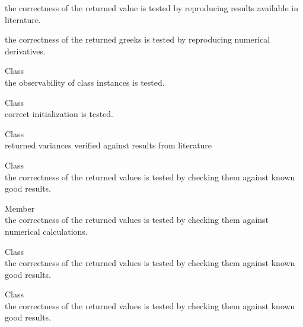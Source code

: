 \begin{DoxyRefList}
\begin{DoxyItemize}
\item the correctness of the returned value is tested by reproducing results available in literature.
\item the correctness of the returned greeks is tested by reproducing numerical derivatives. 
\end{DoxyItemize}
\item[Class \doxylink{class_quant_lib_1_1_quote}{Quant\+Lib\+::Quote} ]\hfill \\
\label{test__test000161}%
%
the observability of class instances is tested.  
\item[Class \doxylink{class_quant_lib_1_1_randomized_l_d_s}{Quant\+Lib\+::Randomized\+LDS\texorpdfstring{$<$}{<} LDS, PRS \texorpdfstring{$>$}{>}} ]\hfill \\
\label{test__test000060}%
%
correct initialization is tested.  
\item[Class \doxylink{class_quant_lib_1_1_replicating_variance_swap_engine}{Quant\+Lib\+::Replicating\+Variance\+Swap\+Engine} ]\hfill \\
\label{test__test000127}%
%
returned variances verified against results from literature  
\item[Class \doxylink{class_quant_lib_1_1_ridder}{Quant\+Lib\+::Ridder} ]\hfill \\
\label{test__test000074}%
%
the correctness of the returned values is tested by checking them against known good results. 
\item[Member \doxylink{namespace_quant_lib_ac53b76df55c7fbcc29b2636c8c311662}{Quant\+Lib\+::Risk\+Statistics} ]\hfill \\
\label{test__test000077}%
%
the correctness of the returned values is tested by checking them against numerical calculations.  
\item[Class \doxylink{class_quant_lib_1_1_rounding}{Quant\+Lib\+::Rounding} ]\hfill \\
\label{test__test000066}%
%
the correctness of the returned values is tested by checking them against known good results.  
\item[Class \doxylink{class_quant_lib_1_1_secant}{Quant\+Lib\+::Secant} ]\hfill \\
\label{test__test000075}%
%
the correctness of the returned values is tested by checking them against known good results. 

\end{DoxyRefList}
